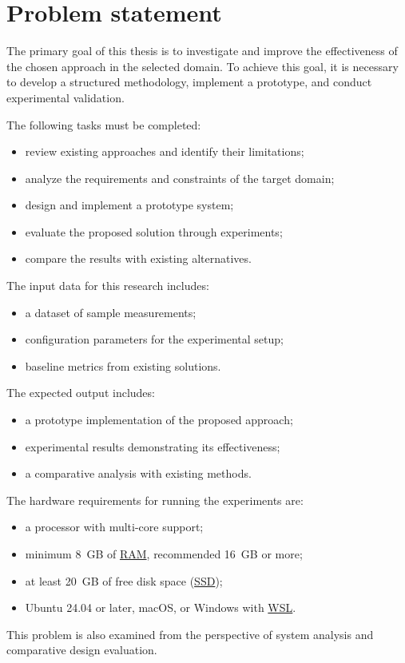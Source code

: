 \section{Problem statement}

The primary goal of this thesis is to investigate and improve the effectiveness of the chosen approach in the selected domain.
To achieve this goal, it is necessary to develop a structured methodology, implement a prototype, and conduct experimental validation.

The following tasks must be completed:
\begin{itemize}
    \item review existing approaches and identify their limitations;
    \item analyze the requirements and constraints of the target domain;
    \item design and implement a prototype system;
    \item evaluate the proposed solution through experiments;
    \item compare the results with existing alternatives.
\end{itemize}

The input data for this research includes:
\begin{itemize}
    \item a dataset of sample measurements;
    \item configuration parameters for the experimental setup;
    \item baseline metrics from existing solutions.
\end{itemize}

The expected output includes:
\begin{itemize}
    \item a prototype implementation of the proposed approach;
    \item experimental results demonstrating its effectiveness;
    \item a comparative analysis with existing methods.
\end{itemize}

The hardware requirements for running the experiments are:
\begin{itemize}
    \item a processor with multi-core support;
    \item minimum 8~GB of \hyperlink{ram}{RAM}, recommended 16~GB or more;
    \item at least 20~GB of free disk space (\hyperlink{ssd}{SSD});
    \item Ubuntu 24.04 or later, macOS, or Windows with \hyperlink{wsl}{WSL}.
\end{itemize}

This problem is also examined from the perspective of system analysis and comparative design evaluation.

\clearpage
